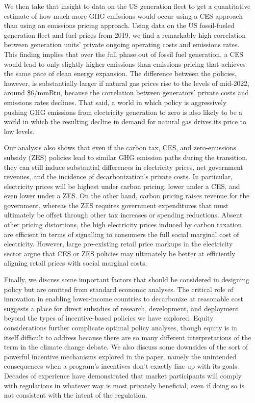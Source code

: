\documentclass[12pt]{article}
\begin{document}
We then take that insight to data on the US generation fleet to get a quantitative estimate of how much more GHG emissions would occur using a CES approach than using an emissions pricing approach.  Using data on the US fossil-fueled generation fleet and fuel prices from 2019, we find a remarkably high correlation between generation units' private ongoing operating costs and emissions rates. This finding implies that over the full phase out of fossil fuel generation, a CES would lead to only slightly higher emissions than emissions pricing that achieves the same pace of clean energy expansion.  The difference between the policies, however, is substantially larger if natural gas prices rise to the levels of mid-2022, around \$6/mmBtu, because the correlation between generators' private costs and emissions rates declines. That said, a world in which policy is aggressively pushing GHG emissions from electricity generation to zero is also likely to be a world in which the resulting decline in demand for natural gas drives its price to low levels.

Our analysis also shows that even if the carbon tax, CES, and zero-emissions subsidy (ZES) policies lead to similar GHG emission paths during the transition, they can still induce substantial differences in electricity prices, net government revenues, and the incidence of decarbonization's private costs. In particular, electricity prices will be highest under carbon pricing, lower under a CES, and even lower under a ZES. On the other hand, carbon pricing raises revenue for the government, whereas the ZES requires government expenditures that must ultimately be offset through other tax increases or spending reductions. Absent other pricing distortions, the high electricity prices induced by carbon taxation are efficient in terms of signalling to consumers the full social marginal cost of electricity. However, large pre-existing retail price markups in the electricity sector argue that CES or ZES policies may ultimately be better at efficiently aligning retail prices with social marginal costs.

Finally, we discuss some important factors that should be considered in designing policy but are omitted from standard economic analyses. The critical role of innovation in enabling lower-income countries to decarbonize at reasonable cost suggests a place for direct subsidies of research, development, and deployment beyond the types of incentive-based policies we have explored. Equity considerations further complicate optimal policy analyses, though equity is in itself difficult to address because there are so many different interpretations of the term in the climate change debate. We also discuss some downsides of the sort of powerful incentive mechanisms explored in the paper, namely the unintended consequences when a program's incentives don't exactly line up with its goals.  Decades of experience have demonstrated that market participants will comply with regulations in whatever way is most privately beneficial, even if doing so is not consistent with the intent of the regulation.
\end{document}
